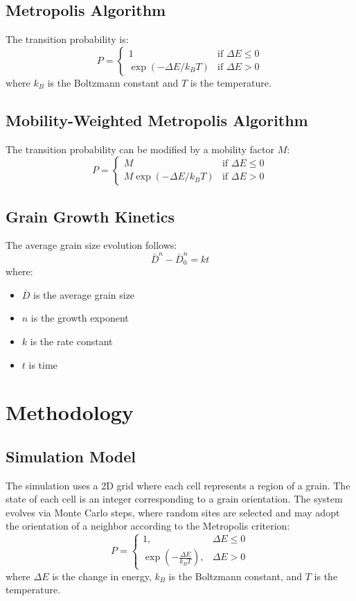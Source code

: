 \documentclass[12pt]{article}
\begin{document}
\subsection{Metropolis Algorithm}
The transition probability is:
\[
P = \begin{cases}
1 & \text{if } \Delta E \leq 0 \\
\exp(-\Delta E/k_BT) & \text{if } \Delta E > 0
\end{cases}
\]
where $k_B$ is the Boltzmann constant and $T$ is the temperature.

\subsection{Mobility-Weighted Metropolis Algorithm}
The transition probability can be modified by a mobility factor $M$:
\[
P = \begin{cases}
M & \text{if } \Delta E \leq 0 \\
M\exp(-\Delta E/k_BT) & \text{if } \Delta E > 0
\end{cases}
\]

\subsection{Grain Growth Kinetics}
The average grain size evolution follows:
\[
\bar{D}^n - \bar{D}_0^n = kt
\]
where:
\begin{itemize}
    \item $\bar{D}$ is the average grain size
    \item $n$ is the growth exponent
    \item $k$ is the rate constant
    \item $t$ is time
\end{itemize}

\section{Methodology}
\subsection{Simulation Model}
The simulation uses a 2D grid where each cell represents a region of a grain. The state of each cell is an integer corresponding to a grain orientation. The system evolves via Monte Carlo steps, where random sites are selected and may adopt the orientation of a neighbor according to the Metropolis criterion:
\[
P = \begin{cases}
1, & \Delta E \leq 0 \\
\exp\left(-\frac{\Delta E}{k_B T}\right), & \Delta E > 0
\end{cases}
\]
where $\Delta E$ is the change in energy, $k_B$ is the Boltzmann constant, and $T$ is the temperature.
\end{document}
